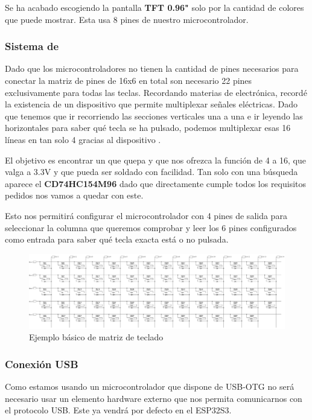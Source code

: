 Se ha acabado escogiendo la pantalla \textbf{\gls{TFT} 0.96"} solo por la cantidad de colores que puede mostrar. Esta usa 8 pines de nuestro microcontrolador.

\subsubsection{Sistema de }
Dado que los microcontroladores no tienen la cantidad de pines necesarios para conectar la matriz de pines de 16x6 en total son necesario 22 pines exclusivamente para todas las teclas. Recordando materias de electrónica, recordé la existencia de un dispositivo que permite multiplexar señales eléctricas. Dado que tenemos que ir recorriendo las secciones verticales una a una e ir leyendo las horizontales para saber qué tecla se ha pulsado, podemos multiplexar esas 16 líneas en tan solo 4 gracias al dispositivo .

El objetivo es encontrar un  que quepa y que nos ofrezca la función de 4 a 16, que valga a 3.3V y que pueda ser soldado con facilidad. Tan solo con una búsqueda aparece el \textbf{CD74HC154M96} dado que directamente cumple todos los requisitos pedidos nos vamos a quedar con este.

Esto nos permitirá configurar el microcontrolador con 4 pines de salida para seleccionar la columna que queremos comprobar y leer los 6 pines configurados como entrada para saber qué tecla exacta está o no pulsada.

\begin{figure}[H]
    \centering
    \includegraphics[width=1\textwidth]{imagenes/Capitulos/Cap03/EjemploArrayTeclado.png}
    \caption{Ejemplo básico de matriz de teclado \cite{EjemploArrayTeclado}}
    \label{fig:EjemploArrayTeclado}
\end{figure}

\newpage
\subsubsection{Conexión \gls{USB}} \label{DiseñoConexiones}
Como estamos usando un microcontrolador que dispone de \gls{USB}-OTG no será necesario usar un elemento hardware externo que nos permita comunicarnos con el protocolo \gls{USB}. Este ya vendrá por defecto en el ESP32S3.

